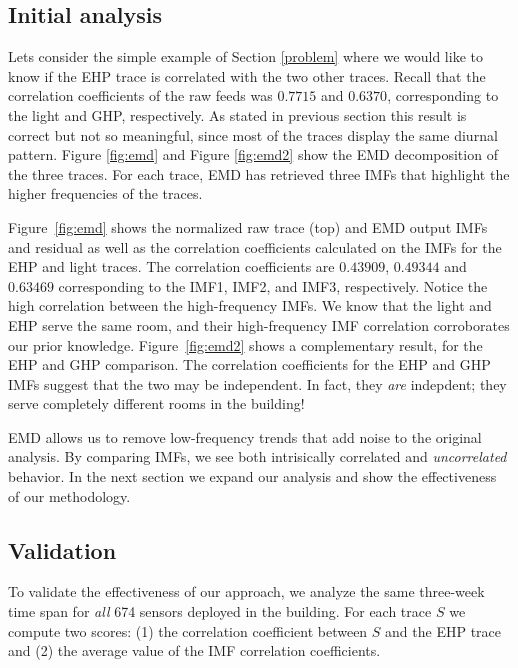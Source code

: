 \subsection{Initial analysis}
Lets consider the simple example of Section \ref{problem} where we would like to know if the EHP trace is correlated with the two other traces.
Recall that the correlation coefficients of the raw feeds was $0.7715$ and $0.6370$, corresponding to the light 
and GHP, respectively.
As stated in previous section this result is correct but not so meaningful, since most of the traces
display the same diurnal pattern.
Figure \ref{fig:emd} and Figure \ref{fig:emd2} show the EMD decomposition of the three traces.
For each trace, EMD has retrieved three IMFs that highlight the higher frequencies of the traces.

Figure~\ref{fig:emd} shows the normalized raw trace (top) and EMD output IMFs and residual as well as the 
correlation coefficients calculated on the IMFs for the EHP and
light traces.  The correlation coefficients are $0.43909$, $0.49344$ and $0.63469$ corresponding to the IMF1, 
IMF2, and IMF3, respectively.  Notice the high correlation between the high-frequency IMFs.
We know that the light and EHP serve the same room, and their high-frequency IMF correlation corroborates
our prior knowledge.
Figure~\ref{fig:emd2} shows a complementary result, for the EHP and GHP comparison.
The correlation coefficients for the EHP and GHP IMFs suggest that the two may be independent.  In fact, they
\emph{are} indepdent; they serve completely different rooms in the building!

EMD allows us to remove low-frequency trends that add noise to the original analysis.
By comparing IMFs, we see both intrisically correlated and \emph{uncorrelated} behavior.  In the next
section we expand our analysis and show the effectiveness of our methodology. 







\subsection{Validation}
To validate the effectiveness of our approach, we analyze the same three-week time span for \emph{all} 674 
sensors deployed in the building.
For each trace $S$ we compute two scores: (1) the correlation coefficient between $S$ and the EHP trace
and (2) the average value of the IMF correlation coefficients.


